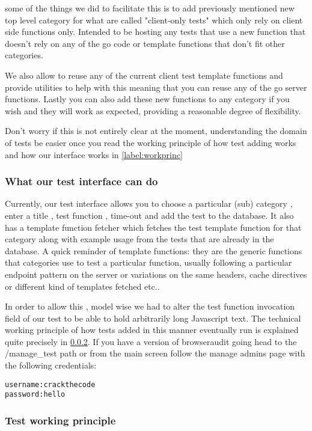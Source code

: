 some of the things we did to facilitate this is to add previously mentioned new top level category for what are called "client-only tests"
which only rely on client side functions only. Intended to be hosting any tests that use a new function that doesn't rely on any of the go code
or template functions that don't fit other categories.

We also allow to reuse any of the current client test template functions and provide utilities to help with this meaning
that you can reuse any of the go server functions. Lastly you can also add these new functions to any category if you wish and they will work
as expected, providing a reasonable degree of flexibility.

Don't worry if this is not entirely clear at the moment,  understanding  the domain of tests be easier once you read the
working principle of how test adding works and how our interface works in \ref{label:workprinc}

\subsubsection{What our test interface can do}

Currently, our test interface allows you to choose a particular (sub) category , enter a title , test function , time-out and add the test to the database.
It also has a template function fetcher which fetches the test template function for that category along with example usage from the tests that are already in the database.
A quick reminder of template functions: they are the generic functions that categories use to test a particular function, usually following a particular
endpoint pattern on the server or variations on the same headers, cache directives or different kind of templates fetched etc..

In order to allow this , model wise we had to alter the test function invocation field of our test to be able to hold arbitrarily long Javascript text.
The technical working principle of how tests added in this manner eventually run is explained quite precisely in \ref{subsec:princ}. 
If you have a version of browseraudit going head to the /manage\_test path or from the main screen follow the manage admins page with the following credentials:

\begin{verbatim}
username:crackthecode
password:hello
\end{verbatim}

\subsubsection{Test working principle}
\label{subsec:princ}


